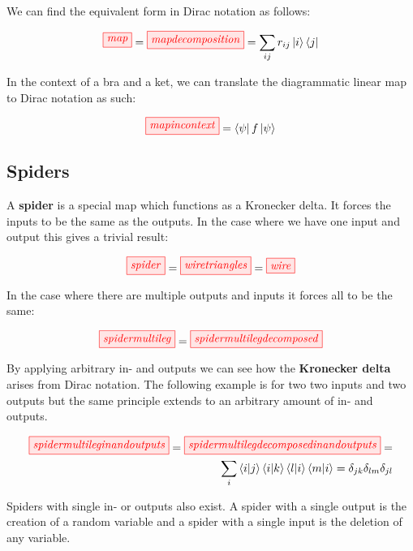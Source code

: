 \documentclass[]{article}
\begin{document}
We can find the equivalent form in Dirac notation as follows:

\begin{equation}
\tikzfig{map} = \tikzfig{mapdecomposition} = \sum_{ij}r_{ij}\ket{i}\bra{j}
\end{equation}

In the context of a bra and a ket, we can translate the diagrammatic linear map to Dirac notation as such:

\begin{equation}
\tikzfig{mapincontext} = \bra{\psi}f\ket{\psi}
\end{equation}

\subsection{Spiders}
\label{spiders}

A \textbf{spider} is a special map which functions as a Kronecker delta. It forces the inputs to be the same as the outputs. In the case where we have one input and output this gives a trivial result:

\begin{equation}
\tikzfig{spider} = \tikzfig{wiretriangles} = \tikzfig{wire}
\end{equation}

In the case where there are multiple outputs and inputs it forces all to be the same:

\begin{equation}
\tikzfig{spidermultileg} = \tikzfig{spidermultilegdecomposed}
\end{equation}

By applying arbitrary in- and outputs we can see how the \textbf{Kronecker delta} arises from Dirac notation. The following example is for two two inputs and two outputs but the same principle extends to an arbitrary amount of in- and outputs.

\begin{equation}
\begin{split}
\tikzfig{spidermultileginandoutputs} = \tikzfig{spidermultilegdecomposedinandoutputs} = \\ \sum_{i} \bra{i}\ket{j}\bra{i}\ket{k}\bra{l}\ket{i}\bra{m}\ket{i} = \delta_{jk} \delta_{lm}  \delta_{jl}
\end{split}
\end{equation}

Spiders with single in- or outputs also exist. A spider with a single output is the creation of a random variable and a spider with a single input is the deletion of any variable.
\end{document}
